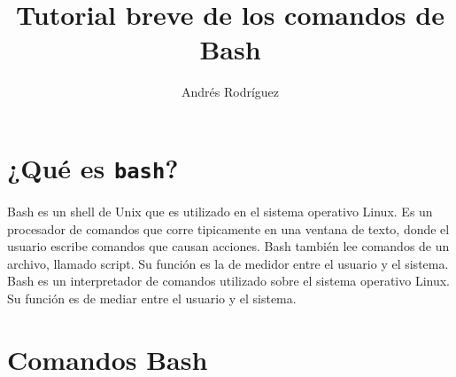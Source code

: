 \documentclass[12pt]{article}
\title{Tutorial breve de los comandos de Bash}
\author{Andr\'es Rodr\'iguez}
\date{}
\begin{document}
\maketitle

\section{¿Qué es {\tt bash}?}
Bash es un shell de Unix que es utilizado en el sistema operativo Linux. Es un procesador de comandos que corre tipicamente en una ventana de texto, donde el usuario escribe comandos que causan acciones. Bash tambi\'en lee comandos de un archivo, llamado script. Su funci\'on es la de medidor entre el usuario y el sistema. 
Bash es un interpretador de comandos utilizado sobre el sistema operativo Linux.
Su función es de mediar entre el usuario y el sistema.

\section{Comandos Bash}
\end{document}
